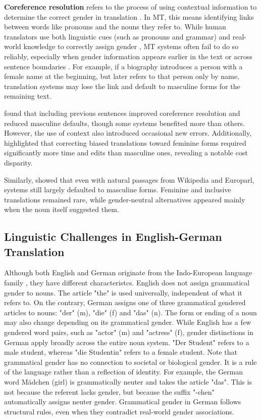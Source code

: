 \textbf{Coreference resolution} refers to the process of using contextual information to determine the correct gender in translation \citep{stanczakSurveyGenderBias2021}. In MT, this means identifying links between words like pronouns and the nouns they refer to. While human translators use both linguistic cues (such as pronouns and grammar) and real-world knowledge to correctly assign gender \citep{rescignoGenderBiasMachine2023}, MT systems often fail to do so reliably, especially when gender information appears earlier in the text or across sentence boundaries \citep{choMeasuringGenderBias2019,stanovskyEvaluatingGenderBias2019}. For example, if a biography introduces a person with a female name at the beginning, but later refers to that person only by name, translation systems may lose the link and default to masculine forms for the remaining text.

\citet{rescignoGenderBiasMachine2023} found that including previous sentences improved coreference resolution and reduced masculine defaults, though some systems benefited more than others. However, the use of context also introduced occasional new errors. Additionally, \citet{savoldiWhatHarmQuantifying2024} highlighted that correcting biased translations toward feminine forms required significantly more time and edits than masculine ones, revealing a notable cost disparity.

Similarly, \citet{lardelliBuildingBridgesDataset2024} showed that even with natural passages from Wikipedia and Europarl, systems still largely defaulted to masculine forms. Feminine and inclusive translations remained rare, while gender-neutral alternatives appeared mainly when the noun itself suggested them.


\subsection{Linguistic Challenges in English-German Translation}

Although both English and German originate from the Indo-European language family \citep{baldiEnglishIndoEuropeanLanguage2008}, they have different characteristcs. English does not assign grammatical gender to nouns. The article "the" is used universally, independent of what it refers to. On the contrary, German assigns one of three grammatical gendered articles to nouns: "der" (m), "die" (f) and "das" (n). The form or ending of a noun may also change depending on its grammatical gender. While English has a few gendered word pairs, such as "actor" (m) and "actress" (f), gender distinctions in German apply broadly across the entire noun system. "Der Student" refers to a male student, whereas "die Studentin" refers to a female student. Note that grammatical gender has no connection to societal or biological gender. It is a rule of the language rather than a reflection of identity. For example, the German word Mädchen (girl) is grammatically neuter and takes the article "das". This is not because the referent lacks gender, but because the suffix "-chen" automatically assigns neuter gender. Grammatical gender in German follows structural rules, even when they contradict real-world gender associations.


